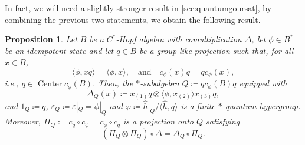 \documentclass[a4paper,10pt]{amsart}
\newcommand{\eval}[2]{\langle #1 , #2\rangle}
\newtheorem{proposition}[theorem]{Proposition}
\theoremstyle{definition}
\begin{document}
In fact, we will need a slightly stronger result in \cref{sec:quantumgoursat}, by combining the previous two statements, we obtain the following result.
\begin{proposition}
\label{prop:qHG_3}
Let $B$ be a $C^*$-Hopf algebra with comultiplication $\Delta$, let $\phi\in B^*$ be an idempotent state and let $q\in B$ be a group-like projection such that, for all $x\in B$,
\begin{equation}\label{eq:prop_q_phi}
\eval{\phi}{xq} = \eval{\phi}{x}
,\quad\text{and}\quad
c_\phi(x) q
=
q c_\phi(x),
\end{equation}
i.e.,
$q\in\operatorname{Center} c_\phi(B)$. 
Then, the $*$-sub\-al\-ge\-bra $Q \coloneqq qc_\phi(B)q$ equipped with
\begin{equation}
    \Delta_Q(x)
        \coloneqq
        x_{(1)} q 
            \otimes \eval{\phi}{x_{(2)}} x_{(3)} q,
\end{equation}
and $1_Q \coloneqq q$, $\varepsilon_Q \coloneqq \varepsilon|_Q = \phi|_Q$ and $\varphi \coloneqq  \hat{h}|_Q / \eval{\hat{h}}{q}$ is a finite $*$-quantum hypergroup.
\smallbreak\noindent%
Moreover, $\Pi_Q:= c_q \circ c_\phi = c_\phi \circ c_q$ is a projection onto $Q$ satisfying
\begin{equation} \label{eq:intertwine_Q}
        (\Pi_Q \otimes \Pi_Q) \circ \Delta = \Delta_Q \circ \Pi_Q.
    \end{equation}
\end{proposition}
\end{document}
